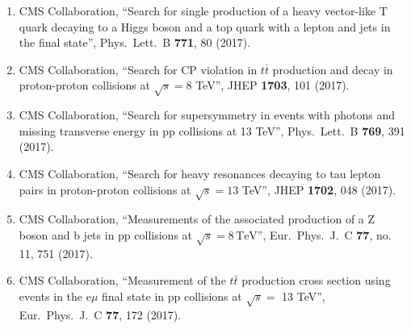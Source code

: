 \begin{itemize}
\begin{enumerate}
\item CMS Collaboration, ``Search for single production of a heavy vector-like T quark decaying to a Higgs boson and a top quark with a lepton and jets in the final state'', Phys.\ Lett.\ B {\bf 771}, 80 (2017).

\item CMS Collaboration, ``Search for CP violation in $ t\overline{t} $ production and decay in proton-proton collisions at $ \sqrt{s}=8 $ TeV'', JHEP {\bf 1703}, 101 (2017).

\item CMS Collaboration, ``Search for supersymmetry in events with photons and missing transverse energy in pp collisions at 13 TeV'', Phys.\ Lett.\ B {\bf 769}, 391 (2017).

\item CMS Collaboration, ``Search for heavy resonances decaying to tau lepton pairs in proton-proton collisions at $ \sqrt{s}=13 $ TeV'', JHEP {\bf 1702}, 048 (2017).

\item CMS Collaboration, ``Measurements of the associated production of a Z boson and b jets in pp collisions at ${\sqrt{s}} = 8\,\text {TeV} $'', Eur.\ Phys.\ J.\ C {\bf 77}, no. 11, 751 (2017).

\item CMS Collaboration, ``Measurement of the $t\bar{t}$ production cross section using events in the e$\mu$ final state in pp collisions at $\sqrt{s} =$ 13 TeV'', Eur.\ Phys.\ J.\ C {\bf 77}, 172 (2017).


\end{enumerate}
\end{itemize}
